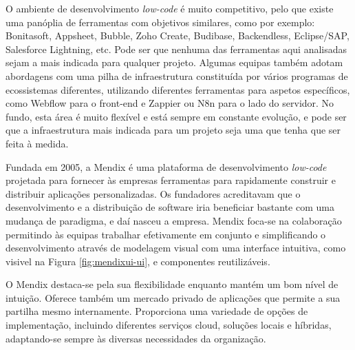     O ambiente de desenvolvimento \textit{low-code} é muito competitivo, pelo que existe uma panóplia de ferramentas com objetivos similares, como por exemplo: Bonitasoft, Appsheet, Bubble, Zoho Create, Budibase, Backendless, Eclipse/SAP, Salesforce Lightning, etc. Pode ser que nenhuma das ferramentas aqui analisadas sejam a mais indicada para qualquer projeto. Algumas equipas também adotam abordagens com uma pilha de infraestrutura constituída por vários programas de ecossistemas diferentes, utilizando diferentes ferramentas para aspetos específicos, como Webflow para o front-end e Zappier ou N8n para o lado do servidor. No fundo, esta área é muito flexível e está sempre em constante evolução, e pode ser que a infraestrutura mais indicada para um projeto seja uma que tenha que ser feita à medida.
        


    \label{secsecsec:mendix}
        
        Fundada em 2005, a Mendix é uma plataforma de desenvolvimento \textit{low-code} projetada para fornecer às empresas ferramentas para rapidamente construir e distribuir aplicações personalizadas. Os fundadores acreditavam que o desenvolvimento e a distribuição de software iria beneficiar bastante com uma mudança de paradigma, e daí nasceu a empresa. Mendix foca-se na colaboração permitindo às equipas trabalhar efetivamente em conjunto e simplificando o desenvolvimento através de modelagem visual com uma interface intuitiva, como visivel na Figura \ref{fig:mendixui-ui}, e componentes reutilizáveis\cite{why-was-mendix-founded}.

        O Mendix destaca-se pela sua flexibilidade enquanto mantém um bom nível de intuição. Oferece também um mercado privado de aplicações que permite a sua partilha mesmo internamente. Proporciona uma variedade de opções de implementação, incluindo diferentes serviços cloud, soluções locais e híbridas, adaptando-se sempre às diversas necessidades da organização\cite{outsystems-vs-mendix}.

